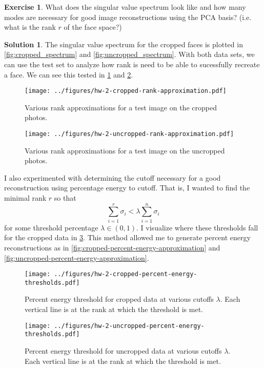 \documentclass[12pt]{article}
\theoremstyle{definition}
\newtheorem{exer}{Exercise}
\newtheorem{sol}{Solution}
\theoremstyle{remark}
\begin{document}
\begin{exer}
What does the singular value spectrum look like and how many modes are necessary for good image
reconstructions using the PCA basis? (i.e. what is the rank $r$ of the face space?)
\end{exer}
\begin{sol}
    The singular value spectrum for the cropped faces is plotted in \ref{fig:cropped_spectrum} and \ref{fig:uncropped_spectrum}. With both data sets, we can use the test set to analyze how rank is need to be able to sucessfully recreate a face. We can see this tested in \cref{fig:cropped-rank-approximation} and \cref{fig:uncropped-rank-approximation}.

    \begin{figure}[h]
        \centering
        \texttt{[image: ../figures/hw-2-cropped-rank-approximation.pdf]}
        \caption{Various rank approximations for a test image on the cropped photos.}%
        \label{fig:cropped-rank-approximation}
    \end{figure}
    \begin{figure}[h]
        \centering
        \texttt{[image: ../figures/hw-2-uncropped-rank-approximation.pdf]}
        \caption{Various rank approximations for a test image on the uncropped photos.}%
        \label{fig:uncropped-rank-approximation}
    \end{figure}

    I also experimented with determining the cutoff necessary for a good reconstruction using percentage energy to cutoff. That is, I wanted to find the minimal rank $r$ so that
    \begin{equation}
        \sum_{i=1}^r \sigma_i < \lambda \sum_{i=1}^{n} \sigma_i
    \end{equation}
    for some threshold percentage $\lambda\in(0,1)$. I visualize where these thresholds fall for the cropped data in \cref{fig:cropped-percent-energy-thresholds}. This method allowed me to generate percent energy reconstructions as in \cref{fig:cropped-percent-energy-approximation} and \cref{fig:uncropped-percent-energy-approximation}.
    \begin{figure}[]
        \centering
        \texttt{[image: ../figures/hw-2-cropped-percent-energy-thresholds.pdf]}
        \caption{Percent energy threshold for cropped data at various cutoffs $\lambda$. Each vertical line is at the rank at which the threshold is met.}%
        \label{fig:cropped-percent-energy-thresholds}
    \end{figure}
    \begin{figure}[]
        \centering
        \texttt{[image: ../figures/hw-2-uncropped-percent-energy-thresholds.pdf]}
        \caption{Percent energy threshold for uncropped data at various cutoffs $\lambda$. Each vertical line is at the rank at which the threshold is met.}%
        \label{fig:uncropped-percent-energy-thresholds}
    \end{figure}


\end{sol}
\end{document}
